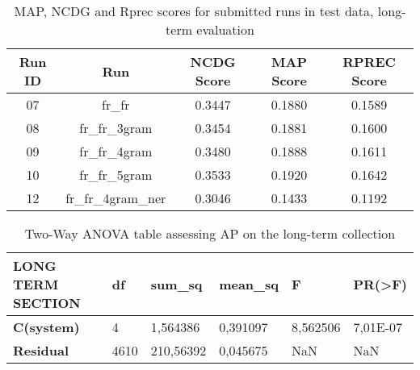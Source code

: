 \begin{table}[h!]
    \begin{center}
        \caption{MAP, NCDG and Rprec scores for submitted runs in test data, long-term evaluation}
        \label{tab:lt_scores}
        \begin{tabular}{|c|c||c|c|c|}
            \hline
            \textbf{Run ID} & \textbf{Run} & \textbf{NCDG Score} & \textbf{MAP Score} & \textbf{RPREC Score}\\
            \hline\hline
            07 & fr\_fr & 0.3447 & 0.1880 & 0.1589 \\
            \hline
            08 & fr\_fr\_3gram & 0.3454 & 0.1881 & 0.1600 \\
            \hline
            09 & fr\_fr\_4gram & 0.3480 & 0.1888 & 0.1611 \\
            \hline
            10 & fr\_fr\_5gram & 0.3533 & 0.1920 & 0.1642 \\
            \hline
            12 & fr\_fr\_4gram\_ner & 0.3046 & 0.1433 & 0.1192\\
            \hline
        \end{tabular}
    \end{center}
\end{table}

\begin{table}[!ht]
    \centering
    \caption{Two-Way ANOVA table assessing AP on the long-term collection}
    \label{tab:lt_anova}
    \begin{tabular}{|l|l|l|l|l|l|}
    \hline
        \textbf{LONG TERM SECTION} & \textbf{df} & \textbf{sum\_sq} & \textbf{mean\_sq} & \textbf{F} & \textbf{PR(>F)} \\ \hline\hline
        \textbf{C(system)} & 4 & 1,564386 & 0,391097 & 8,562506 & 7,01E-07 \\ \hline
        \textbf{Residual} & 4610 & 210,56392 & 0,045675 & NaN & NaN \\ \hline
    \end{tabular}
\end{table}

